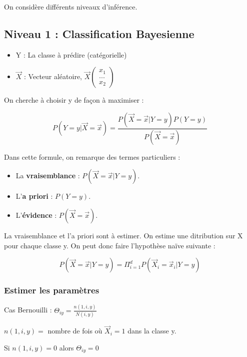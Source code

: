 \documentclass{article}
\begin{document}
On considère différents niveaux d'inférence.

\subsection{Niveau 1 : Classification Bayesienne}

\begin{itemize}
\item Y : La classe à prédire (catégorielle)
\item $\vec{X}$ : Vecteur aléatoire, \( \vec{X} 
\begin{pmatrix} 
      x_1\\ 
      ...\\
      x_2 
\end{pmatrix} \)

\end{itemize}

On cherche à choisir y de façon à maximiser : 

\[ P(Y=y | \vec{X} = \vec{x}) = \frac{P(\vec{X} = \vec{x} | Y=y)P(Y=y)}{P(\vec{X} = \vec{x})} \]

Dans cette formule, on remarque des termes particuliers : 

\begin{itemize}

\item La \textbf{vraisemblance} : $P(\vec{X} = \vec{x} | Y = y)$.
\item L'\textbf{a priori} : $P(Y = y)$.
\item L'\textbf{évidence} : $P(\vec{X} = \vec{x})$.

\end{itemize}

La vraisemblance et l'a priori sont à estimer. On estime une ditribution sur X pour chaque classe y.
On peut donc faire l'hypothèse naïve suivante : 

\[ P(\vec{X}=\vec{x} | Y=y) = \Pi_{i=1}^{d} P(\vec{X}_i = \vec{x}_i | Y = y) \]

\subsubsection*{Estimer les paramètres}

Cas Bernouilli : $\Theta_{iy} = \frac{n(1, i, y)}{N(i, y)}$

$ n(1, i, y) =$ nombre de fois où $\vec{X}_i = 1$ dans la classe y.

Si $n(1, i, y) = 0$ alors $\Theta_{iy} = 0$
\end{document}
